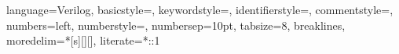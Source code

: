 \usepackage{ifthen}


\usepackage{xcolor}
\usepackage{listings}

{
    language=Verilog,
    basicstyle=\small\ttfamily,
    keywordstyle=\color{vblue},
    identifierstyle=\color{black},
    commentstyle=\color{vgreen},
    numbers=left,
    numberstyle=\tiny\color{black},
    numbersep=10pt,
    tabsize=8,
    breaklines,
    moredelim=*[s][]{[}{]},
    literate=*{:}{:}1
}

\makeatletter
\newcommand*\@lbracket{[}
\newcommand*\@rbracket{]}
\newcommand*\@colon{:}
\newcommand*\colorIndex{%
    \edef\@temp{\the\lst@token}%
    \ifx\@temp\@lbracket \color{black}%
    \else\ifx\@temp\@rbracket \color{black}%
    \else\ifx\@temp\@colon \color{black}%
    \else \color{vorange}%
    \fi\fi\fi
}
\makeatother
